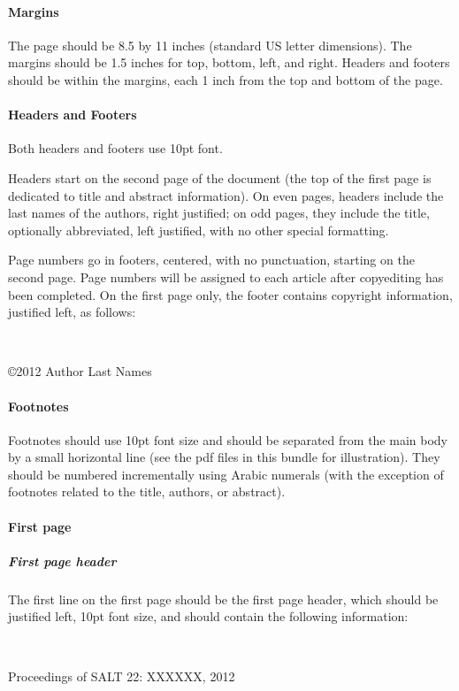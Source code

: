 \documentclass{salt}
\begin{document}
\paragraph{Margins}
The page should be 8.5 by 11 inches (standard US letter dimensions). The margins should be 1.5 inches for top, bottom, left, and right. Headers and footers should be within the margins, each 1 inch from the top and bottom of the page.

\paragraph{Headers and Footers} 
Both headers and footers use 10pt font.

Headers start on the second page of the document (the top of the first page is dedicated to title and abstract information). On even pages, headers include the last names of the authors, right justified; on odd pages, they include the title, optionally abbreviated, left justified, with no other special formatting.

Page numbers go in footers, centered, with no punctuation, starting on the second page. Page numbers will be assigned to each article after copyediting has been completed. On the first page only, the footer contains copyright information, justified left, as follows:
 
 \
 
 \hspace{-.25in}\footnotesize \copyright 2012 Author Last Names \normalsize
 
\paragraph{Footnotes}
Footnotes should use 10pt font size and should be separated from the main body by a small horizontal line (see the pdf files in this bundle for illustration). They should be numbered incrementally using Arabic numerals (with the exception of footnotes related to the title, authors, or abstract).

\paragraph{First page}
\subparagraph{First page header}
The first line on the first page should be the first page header, which should be justified left, 10pt font size, and should contain the following information:

\

\hspace{-.25in}\footnotesize Proceedings of SALT 22: XXX\textendash XXX, 2012 \normalsize
\end{document}

